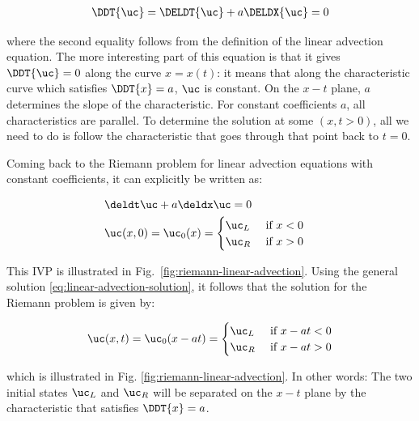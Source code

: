 \begin{align}
    \DDT{\uc} = \DELDT{\uc} + a \DELDX{\uc} = 0
\end{align}

where the second equality follows from the definition of the linear advection equation. The more
interesting part of this equation is that it gives $\DDT{\uc} = 0$ along the curve $x = x(t)$: it
means that along the characteristic curve which satisfies $\DDT{x} = a$, $\uc$ is constant. On the
$x - t$ plane, $a$ determines the slope of the characteristic. For constant coefficients $a$, all
characteristics are parallel. To determine the solution at some $(x, t > 0)$, all we need to do is
follow the characteristic that goes through that point back to $t = 0$.

Coming back to the Riemann problem for linear advection equations with constant coefficients, it
can explicitly be written as:

\begin{align}
    & \deldt \uc + a \deldx \uc = 0 &&\\
    & \uc(x, 0) = \uc_0 (x) = \begin{cases}
                             \uc_L & \text{ if } x < 0 \\
                             \uc_R & \text{ if } x > 0
                            \end{cases} &&
\end{align}


This IVP is illustrated in Fig.~\ref{fig:riemann-linear-advection}. Using the general solution
\ref{eq:linear-advection-solution}, it follows that the solution for the Riemann problem is given
by:

\begin{align}
    \uc(x, t) = \uc_0(x - at) = \begin{cases}
                                    \uc_L & \text{ if } x - at < 0 \\
                                    \uc_R & \text{ if } x - at > 0
                                \end{cases}
\end{align}

which is illustrated in Fig. \ref{fig:riemann-linear-advection}. In other words: The two initial
states $\uc_L$ and $\uc_R$ will be separated on the $x - t$ plane by the characteristic that
satisfies $\DDT{x} = a$.


